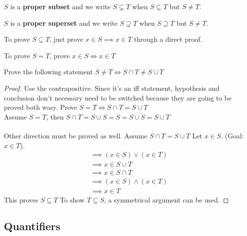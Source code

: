 \documentclass[english, 12pt]{article}
\begin{document}
\begin{defn}
$S$ is a \textbf{proper subset} and we write $S \subsetneq T$ when $S \subseteq T$ but $S \neq T$.
\end{defn}
\begin{defn}
$S$ is a \textbf{proper superset} and we write $S \supsetneq T$ when $S \supseteq T$ but $S \neq T$.
\end{defn}
\begin{mthd}
To prove $S \subseteq T$, just prove $ x \in S \implies x \in T$ through a direct proof.
\begin{center}
To prove $S = T$, prove $ x \in S \iff x \in T$
\end{center}
\end{mthd}

\begin{exmp}
Prove the following statement $S \neq T \iff S \cap T \neq S \cup T$
\begin{proof}
Use the contrapositive. Since it's an iff statement, hypothesis and conclusion don't necessary need to be switched because they are going to be proved both wasy. Prove $S = T \iff S \cap T = S \cup T$\\
Assume $S = T$, then $S \cap T = S \cup S = S = S \cup S = S \cup T$\\\\
Other direction must be proved as well. Assume $S \cap T = S \cup T$
Let $x \in S$. (Goal: $x \in T$).
\begin{align*}
&\implies (x \in S) \lor (x \in T) \\
& \implies x \in S \cup T \\
& \implies x \in S \cap T \\
& \implies (x \in S)\land (x \in T) \\
& \implies  x \in T 
\end{align*}
This proves $S \subseteq T$ To show $T \subseteq S$, a symmetrical argument can be used.
\end{proof}
\end{exmp}
\subsection{Quantifiers}
\end{document}
